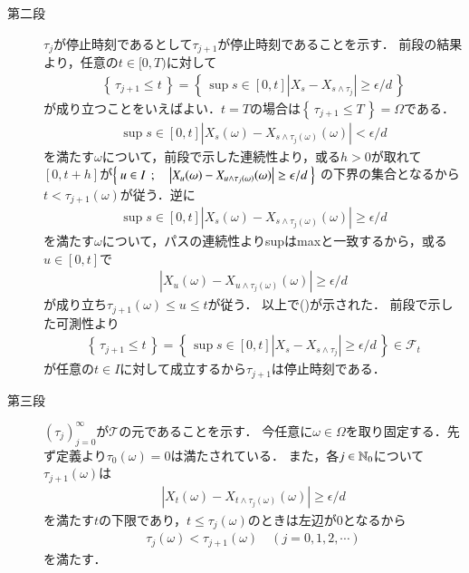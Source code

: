 \begin{prf}
\begin{description}
			\item[第二段]
				$\tau_j$が停止時刻であるとして$\tau_{j+1}$が停止時刻であることを示す．
				前段の結果より，任意の$t \in [0,T)$に対して
				\begin{align}
					\left\{\, \tau_{j+1} \leq t\, \right\}
					= \left\{\, \sup{s \in [0,t]}{\left| X_s - X_{s \wedge \tau_j} \right|} \geq \epsilon/d\, \right\}
					\label{eq:stopping_time_restricting_path_variation}
				\end{align}
				が成り立つことをいえばよい．$t = T$の場合は$\left\{\, \tau_{j+1} \leq T\, \right\} = \Omega$である．
				\begin{align}
					\sup{s \in [0,t]}{\left| X_s(\omega) - X_{s \wedge \tau_j(\omega)}(\omega) \right|} < \epsilon/d
				\end{align}
				を満たす$\omega$について，前段で示した連続性より，或る$h > 0$が取れて
				$[0,t+h]$が$\left\{\ u \in I\ \, ; \quad \left| X_u(\omega) - X_{u \wedge \tau_j(\omega)}(\omega) \right| \geq \epsilon/d\ \right\}$
				の下界の集合となるから$t < \tau_{j+1}(\omega)$が従う．逆に
				\begin{align}
					\sup{s \in [0,t]}{\left| X_s(\omega) - X_{s \wedge \tau_j(\omega)}(\omega) \right|} \geq \epsilon/d
				\end{align}
				を満たす$\omega$について，パスの連続性よりsupはmaxと一致するから，或る$u \in [0,t]$で
				\begin{align}
					\left| X_u(\omega) - X_{u \wedge \tau_j(\omega)}(\omega) \right| \geq \epsilon/d
				\end{align}
				が成り立ち$\tau_{j+1}(\omega) \leq u \leq t$が従う．
				以上で()が示された．
				前段で示した可測性より
				\begin{align}
					\left\{\, \tau_{j+1} \leq t\, \right\}
					= \left\{\, \sup{s \in [0,t]}{\left| X_s - X_{s \wedge \tau_j} \right|} \geq \epsilon/d\, \right\} 
					\in \mathcal{F}_t
				\end{align}
				が任意の$t \in I$に対して成立するから$\tau_{j+1}$は停止時刻である．
			
			\item[第三段]
				$(\tau_j)_{j=0}^{\infty}$が$\mathcal{T}$の元であることを示す．
				今任意に$\omega \in \Omega$を取り固定する．先ず定義より$\tau_0(\omega) = 0$は満たされている．
				また，各$j \in \mathbb{N}_0$について$\tau_{j+1}(\omega)$は
				\begin{align}
					\left| X_t(\omega) - X_{t \wedge \tau_j(\omega)}(\omega) \right| \geq \epsilon/d
				\end{align}
				を満たす$t$の下限であり，$t \leq \tau_j(\omega)$のときは左辺が0となるから
				\begin{align}
					\tau_j(\omega) < \tau_{j+1}(\omega) \quad (j=0,1,2,\cdots)
				\end{align}
				を満たす．
				

\end{description}
\end{prf}
